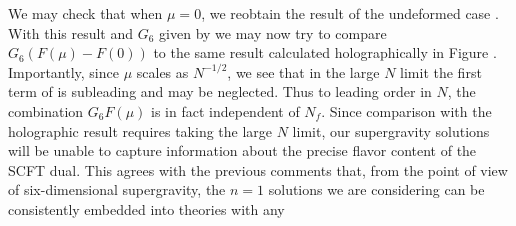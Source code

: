 \documentclass[12pt]{article}
\begin{document}
We may check that when $\mu=0$, we reobtain the result of the undeformed case .
With this result and $G_6$ given by we may now try to compare $G_6(F(\mu)-F(0))$ to the same result calculated holographically in Figure . Importantly, since $\mu$ scales as $N^{-1/2}$, we see that in the large $N$ limit the first term of  is subleading and may be neglected. Thus to leading order in $N$, the combination $G_6 F(\mu)$ is in fact independent of $N_f$. Since comparison with the holographic result requires taking the large $N$ limit, our supergravity solutions will be unable to capture information about the precise flavor content of the SCFT dual. This agrees with the previous comments that, from the point of view of six-dimensional supergravity, the $n=1$ solutions we are considering can be consistently embedded into theories with any
\end{document}
